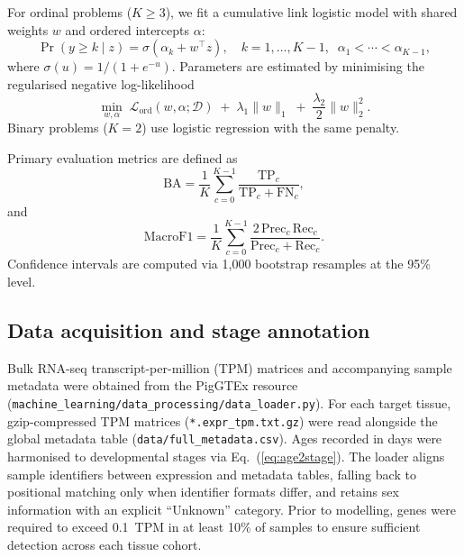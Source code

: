 \documentclass[11pt]{article}
\begin{document}
For ordinal problems ($K \ge 3$), we fit a cumulative link logistic model with shared weights $w$ and ordered intercepts $\alpha$:
\begin{equation}
\Pr\!\left(y \ge k \mid z\right) = \sigma\!\left(\alpha_k + w^\top z\right), \quad k = 1,\dots,K-1,\;\; \alpha_1 < \cdots < \alpha_{K-1},
\label{eq:ordinal}
\end{equation}
where $\sigma(u) = 1/(1+e^{-u})$. Parameters are estimated by minimising the regularised negative log-likelihood
\begin{equation}
\min_{w,\alpha} \; \mathcal{L}_{\mathrm{ord}}(w,\alpha;\mathcal{D}) \;+\; \lambda_1 \lVert w \rVert_1 \;+\; \frac{\lambda_2}{2} \lVert w \rVert_2^2.
\label{eq:objective}
\end{equation}
Binary problems ($K{=}2$) use logistic regression with the same penalty.

Primary evaluation metrics are defined as
\begin{equation}
\mathrm{BA} = \frac{1}{K} \sum_{c=0}^{K-1} \frac{\mathrm{TP}_c}{\mathrm{TP}_c + \mathrm{FN}_c},
\label{eq:ba}
\end{equation}
and
\begin{equation}
\mathrm{MacroF1} = \frac{1}{K} \sum_{c=0}^{K-1} \frac{2\,\mathrm{Prec}_c\,\mathrm{Rec}_c}{\mathrm{Prec}_c+\mathrm{Rec}_c}.
\label{eq:macroF1}
\end{equation}
Confidence intervals are computed via 1,000 bootstrap resamples at the 95\% level.

\subsection{Data acquisition and stage annotation}
Bulk RNA-seq transcript-per-million (TPM) matrices and accompanying sample metadata were obtained from the PigGTEx resource (\texttt{machine\_learning/data\_processing/data\_loader.py}). For each target tissue, gzip-compressed TPM matrices (\texttt{*.expr\_tpm.txt.gz}) were read alongside the global metadata table (\texttt{data/full\_metadata.csv}). Ages recorded in days were harmonised to developmental stages via Eq.~(\ref{eq:age2stage}). The loader aligns sample identifiers between expression and metadata tables, falling back to positional matching only when identifier formats differ, and retains sex information with an explicit ``Unknown'' category. Prior to modelling, genes were required to exceed 0.1~TPM in at least 10\% of samples to ensure sufficient detection across each tissue cohort.
\end{document}
